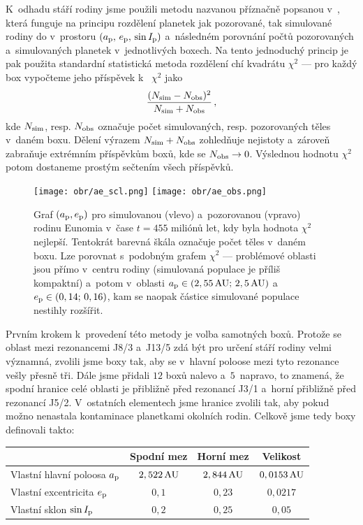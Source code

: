 \documentclass[A4paper, 12pt, oneside, openany]{book}
\begin{document}
K~odhadu stáří rodiny jsme použili metodu nazvanou příznačně  popsanou v~\cite{broz19}, která funguje na principu rozdělení planetek jak pozorované, tak simulované rodiny do  v~prostoru $(a_{\rm p},\,e_{\rm p},\,\sin I_{\rm p})$ a~následném porovnání počtů pozorovaných a~simulovaných planetek v~jednotlivých boxech. Na tento jednoduchý princip je pak použita standardní statistická metoda rozdělení chí kvadrátu $\chi^2$ --- pro každý box vypočteme jeho příspěvek k~ $\chi^2$ jako
\begin{align}
	\frac{(N_{\rm sim}-N_{\rm obs})^2}{N_{\rm sim}+N_{\rm obs}}\,,
\end{align}
kde $N_{\rm sim}$, resp. $N_{\rm obs}$ označuje počet simulovaných, resp. pozorovaných těles v~daném boxu. Dělení výrazem $N_{\rm sim}+N_{\rm obs}$ zohledňuje nejistoty a~zároveň zabraňuje extrémním příspěvkům boxů, kde se $N_{\rm obs}\rightarrow 0$. Výslednou hodnotu $\chi^2$ potom dostaneme prostým sečtením všech příspěvků.

\immediate{}
\immediate{}
\begin{figure}
	\centering
	\texttt{[image: obr/ae\_scl.png]}
	\texttt{[image: obr/ae\_obs.png]}\\
	\caption{Graf $(a_{\rm p}, e_{\rm p})$ pro simulovanou (vlevo) a~pozorovanou (vpravo) rodinu Eunomia v~čase $t=455$ miliónů let, kdy byla hodnota $\chi^2$ nejlepší. Tentokrát barevná škála označuje počet těles v~daném boxu. Lze porovnat s~podobným grafem $\chi^2$ --- problémové oblasti jsou přímo v~centru rodiny (simulovaná populace je příliš kompaktní) a~potom v~oblasti $a_{\rm p}\in(2,55\,{\rm AU};\,2,5\,{\rm AU})$ a~$e_{\rm p}\in(0,14;\,0,16)$, kam se naopak částice simulované populace nestihly rozšířit.} \label{fig:ae_obs_scl}
\end{figure}

Prvním krokem k~provedení této metody je volba samotných boxů. Protože se oblast mezi rezonancemi J8/3 a~J13/5 zdá být pro určení stáří rodiny velmi významná, zvolili jsme boxy tak, aby se v~hlavní poloose mezi tyto rezonance vešly přesně tři. Dále jsme přidali $12$ boxů nalevo a~$5$~napravo, to znamená, že spodní hranice celé oblasti je přibližně před rezonancí J3/1 a~horní přibližně před rezonancí J5/2. V~ostatních elementech jsme hranice zvolili tak, aby pokud možno nenastala kontaminace planetkami okolních rodin. Celkově jsme tedy boxy definovali takto:

\begin{center}
\begin{tabularx}{0.8\textwidth}{|X||c|c|c|}
	\hline
	& Spodní mez & Horní mez & Velikost  \\
	\hline \hline
	Vlastní hlavní poloosa $a_{\rm p}$ & $2,522\,{\rm AU}$ & $2,844\,{\rm AU}$ & $0,0153\,{\rm AU}$ \\
	\hline
	Vlastní excentricita $e_{\rm p}$ & $0,1$ & $0,23$ & $0,0217$ \\
	\hline
	Vlastní sklon $\sin I_{\rm p}$ & $0,2$ & $0,25$ & $0,05$ \\
	\hline
\end{tabularx}
\end{center}
\end{document}

